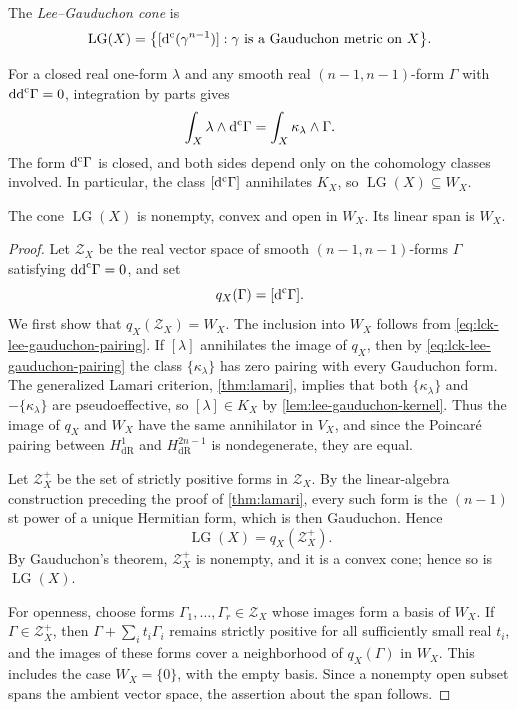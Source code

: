 \begin{definition}\label{def:lee-gauduchon-cone}
The \emph{Lee--Gauduchon cone} is
\[
 \operatorname{LG}(X)
 =\bigl\{[\mathrm d^{\mathrm c}(\gamma^{n-1})]:
                    \gamma\text{ is a Gauduchon metric on }X\bigr\}.
\]
\end{definition}

For a closed real one-form $\lambda$ and any smooth real $(n-1,n-1)$-form $\Gamma$ with $\mathrm{dd}^{\mathrm{c}}\Gamma=0$, integration by parts gives
\begin{equation}\label{eq:lck-lee-gauduchon-pairing}
 \int_X\lambda\wedge\mathrm d^{\mathrm c}\Gamma
 =\int_X\kappa_\lambda\wedge\Gamma.
\end{equation}
The form $\mathrm d^{\mathrm c}\Gamma$ is closed, and both sides depend only on the cohomology classes involved. In particular, the class $[\mathrm d^{\mathrm c}\Gamma]$ annihilates $K_X$, so $\operatorname{LG}(X)\subseteq W_X$.

\begin{proposition}\label{prop:lee-gauduchon-open}
The cone $\operatorname{LG}(X)$ is nonempty, convex and open in $W_X$. Its linear span is $W_X$.
\end{proposition}
\begin{proof}
Let $\mathcal Z_X$ be the real vector space of smooth $(n-1,n-1)$-forms $\Gamma$ satisfying $\mathrm{dd}^{\mathrm{c}}\Gamma=0$, and set
\[
 q_X(\Gamma)=[\mathrm d^{\mathrm c}\Gamma].
\]
We first show that $q_X(\mathcal Z_X)=W_X$. The inclusion into $W_X$ follows from \eqref{eq:lck-lee-gauduchon-pairing}. If $[\lambda]$ annihilates the image of $q_X$, then by \eqref{eq:lck-lee-gauduchon-pairing} the class $\{\kappa_\lambda\}$ has zero pairing with every Gauduchon form. The generalized Lamari criterion, \cref{thm:lamari}, implies that both $\{\kappa_\lambda\}$ and $-\{\kappa_\lambda\}$ are pseudoeffective, so $[\lambda]\in K_X$ by \cref{lem:lee-gauduchon-kernel}. Thus the image of $q_X$ and $W_X$ have the same annihilator in $V_X$, and since the Poincar\'e pairing between $H^1_{\mathrm{dR}}$ and $H^{2n-1}_{\mathrm{dR}}$ is nondegenerate, they are equal.

Let $\mathcal Z_X^+$ be the set of strictly positive forms in $\mathcal Z_X$. By the linear-algebra construction preceding the proof of \cref{thm:lamari}, every such form is the $(n-1)$st power of a unique Hermitian form, which is then Gauduchon. Hence
\[
 \operatorname{LG}(X)=q_X(\mathcal Z_X^+).
\]
By Gauduchon's theorem, $\mathcal Z_X^+$ is nonempty, and it is a convex cone; hence so is $\operatorname{LG}(X)$.

For openness, choose forms $\Gamma_1,\ldots,\Gamma_r\in\mathcal Z_X$ whose images form a basis of $W_X$. If $\Gamma\in\mathcal Z_X^+$, then $\Gamma+\sum_i t_i\Gamma_i$ remains strictly positive for all sufficiently small real $t_i$, and the images of these forms cover a neighborhood of $q_X(\Gamma)$ in $W_X$. This includes the case $W_X=\{0\}$, with the empty basis. Since a nonempty open subset spans the ambient vector space, the assertion about the span follows.
\end{proof}

